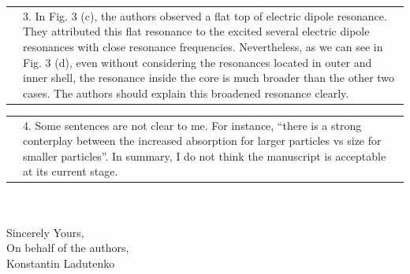 \documentclass[a4paper]{article}
\begin{document}
\begin{tabular}[!H]{l|p{}}
\quad & 3.      In Fig. 3 (c), the authors observed a flat top of
electric dipole resonance. They attributed this flat resonance to the
excited several electric dipole resonances with close resonance
frequencies. Nevertheless, as we can see in Fig. 3 (d), even without
considering the resonances located in outer and inner shell, the
resonance inside the core is much broader than the other two
cases. The authors should explain this broadened resonance clearly. 
\end{tabular}


\begin{tabular}[!H]{l|p{}}
\quad & 4.      Some sentences are not clear to me. For instance,
“there is a strong conterplay between the increased absorption for
larger particles vs size for smaller particles”. 
In summary, I do not think the manuscript is acceptable at its current
stage. 
\end{tabular}%
\\
\vspace{10pt}
\\
Sincerely Yours,\\
On behalf of the authors,\\
Konstantin Ladutenko
\end{document}
